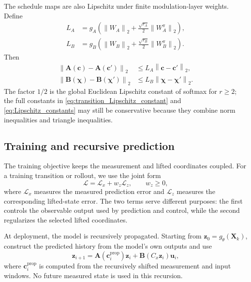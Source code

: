 \documentclass[journal]{IEEEtran}
\newcommand{\vu}{\mathbf{u}}
\newcommand{\vz}{\mathbf{z}}
\newcommand{\vc}{\mathbf{c}}
\newcommand{\vchi}{\boldsymbol{\chi}}
\newcommand{\mA}{\mathbf{A}}
\newcommand{\mB}{\mathbf{B}}
\newcommand{\mX}{\mathbf{X}}
\newcommand{\norm}[1]{\left\lVert #1\right\rVert}
\begin{document}
The schedule maps are also Lipschitz under finite modulation-layer weights. Define
\begin{align}
    L_A&=g_A\left(\norm{W_A}_2+\frac{\sqrt{r_A}}{2}\norm{W_A^\pi}_2\right),
    \label{eq:transition_Lipschitz_constant}\\
    L_B&=g_B\left(\norm{W_B}_2+\frac{\sqrt{r_B}}{2}\norm{W_B^\pi}_2\right).
    \label{eq:Lipschitz_constants}
\end{align}
Then
\begin{equation}
    \begin{aligned}
    \norm{\mA(\vc)-\mA(\vc')}_2&\le L_A\norm{\vc-\vc'}_2,\\
    \norm{\mB(\vchi)-\mB(\vchi')}_2&\le L_B\norm{\vchi-\vchi'}_2.
    \end{aligned}
    \label{eq:schedule_lipschitz}
\end{equation}
The factor $1/2$ is the global Euclidean Lipschitz constant of softmax for $r\ge2$; the full constants in \eqref{eq:transition_Lipschitz_constant} and \eqref{eq:Lipschitz_constants} may still be conservative because they combine norm inequalities and triangle inequalities.

\subsection{Training and recursive prediction}

The training objective keeps the measurement and lifted coordinates coupled. For a training transition or rollout, we use the joint form
\begin{equation}
    \mathcal L=\mathcal L_x+w_z\mathcal L_z,
    \qquad w_z\ge0,
    \label{eq:joint_training_loss}
\end{equation}
where $\mathcal L_x$ measures the measured prediction error and $\mathcal L_z$ measures the corresponding lifted-state error. The two terms serve different purposes: the first controls the observable output used by prediction and control, while the second regularizes the selected lifted coordinates.

At deployment, the model is recursively propagated. Starting from $\vz_0=g_\theta(\mX_k)$, construct the predicted history from the model's own outputs and use
\begin{equation}
    \vz_{i+1}=\mA(\vc_i^{\mathrm{prop}})\vz_i+\mB(C_x\vz_i)\vu_i,
    \label{eq:recursive_prediction}
\end{equation}
where $\vc_i^{\mathrm{prop}}$ is computed from the recursively shifted measurement and input windows. No future measured state is used in this recursion.
\end{document}
